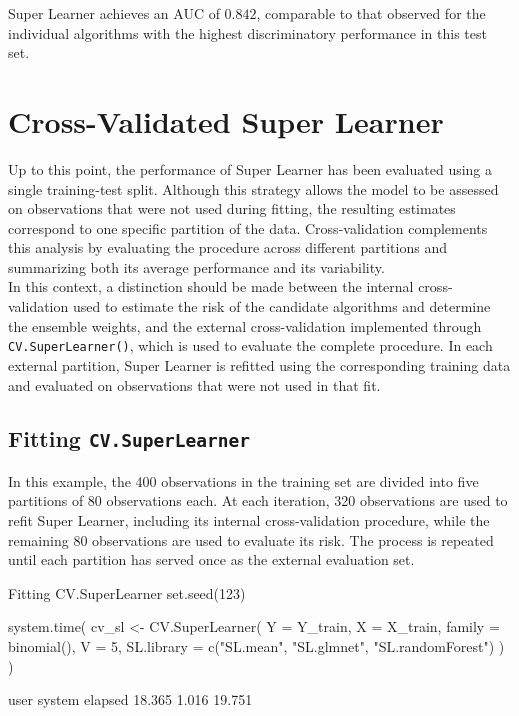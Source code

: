 \documentclass[12pt]{article}
\begin{document}
Super Learner achieves an AUC of $0.842$, comparable to that observed for the individual algorithms with the highest discriminatory performance in this test set.


\section{Cross-Validated Super Learner}
Up to this point, the performance of Super Learner has been evaluated using a single training-test split. Although this strategy allows the model to be assessed on observations that were not used during fitting, the resulting estimates correspond to one specific partition of the data. Cross-validation complements this analysis by evaluating the procedure across different partitions and summarizing both its average performance and its variability. \\
In this context, a distinction should be made between the internal cross-validation used to estimate the risk of the candidate algorithms and determine the ensemble weights, and the external cross-validation implemented through \texttt{CV.SuperLearner()}, which is used to evaluate the complete procedure. In each external partition, Super Learner is refitted using the corresponding training data and evaluated on observations that were not used in that fit.

\subsection{Fitting \texttt{CV.SuperLearner}} 
In this example, the 400 observations in the training set are divided into five partitions of 80 observations each. At each iteration, 320 observations are used to refit Super Learner, including its internal cross-validation procedure, while the remaining 80 observations are used to evaluate its risk. The process is repeated until each partition has served once as the external evaluation set.

\begin{rcode}[label={code:cvsl}]{Fitting CV.SuperLearner}
set.seed(123)

system.time({
  cv_sl <- CV.SuperLearner(
    Y = Y_train, X = X_train,
    family = binomial(),
    V = 5,
    SL.library = c("SL.mean", "SL.glmnet", "SL.randomForest")
  )
})
\end{rcode}

\begin{routputref}[label={box:cvsl-time}]
	user  system elapsed 
	18.365   1.016  19.751 
\end{routputref}
\end{document}
